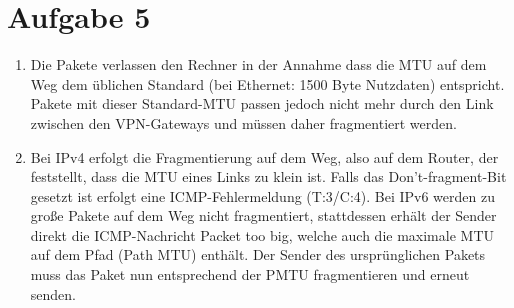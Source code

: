 \documentclass{article}
\begin{document}
	\section*{Aufgabe 5}
	\begin{enumerate}[label=(\alph*)]
		\item Die Pakete verlassen den Rechner in der Annahme dass die MTU auf dem Weg dem üblichen Standard (bei Ethernet: 1500 Byte Nutzdaten) entspricht. Pakete mit dieser Standard-MTU passen jedoch nicht mehr durch den Link zwischen den VPN-Gateways und müssen daher fragmentiert werden. 
		\item Bei IPv4 erfolgt die Fragmentierung auf dem Weg, also auf dem Router, der feststellt, dass die MTU eines Links zu klein ist. Falls das Don't-fragment-Bit gesetzt ist erfolgt eine ICMP-Fehlermeldung (T:3/C:4). Bei IPv6 werden zu große Pakete auf dem Weg nicht fragmentiert, stattdessen erhält der Sender direkt die ICMP-Nachricht Packet too big, welche auch die maximale MTU auf dem Pfad (Path MTU) enthält. Der Sender des ursprünglichen Pakets muss das Paket nun entsprechend der PMTU fragmentieren und erneut senden.
	\end{enumerate}
\end{document}
